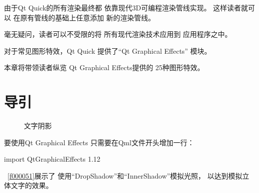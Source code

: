﻿





由于Qt Quick的所有渲染最终都
依靠现代3D可编程渲染管线实现。
这样读者就可以
在原有管线的基础上任意添加
新的渲染管线。

毫无疑问，读者可以不受限的将
所有现代渲染技术应用到
应用程序之中。

对于常见图形特效，Qt Quick
提供了“Qt Graphical Effects”
模块。

本章将带领读者纵览
Qt Graphical Effects提供的
25种图形特效。

\FloatBarrier
\section{
导引
}\label{c000015s000001}


\begin{figure}[htb] %
\marginnote{\setlength\fboxsep{2pt}\fbox{\footnotesize{\kaishu\figurename\,}\footnotesize{\ref{p000012}}}}\centering %
\setlength\fboxsep{0pt} %
\caption{文字阴影} %
\label{p000012} %
\end{figure}


要使用Qt Graphical Effects
只需要在Qml文件开头增加一行：\begin{littlelongworld}
import QtGraphicalEffects 1.12
\end{littlelongworld}
\hspace*{\parindent}\filesourcenumbernameone\ \ref{f000051}展示了
使用“DropShadow”和“InnerShadow”模拟光照，
以达到模拟立体文字的效果。

